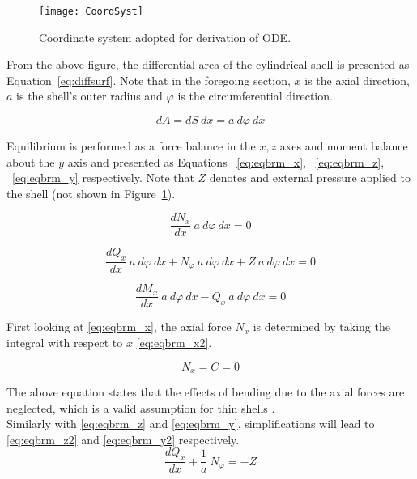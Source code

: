 \begin{figure}[H]
	\centering
	\texttt{[image: CoordSyst]}
	\caption[Coordinate system adopted for derivation of ODE.]{Coordinate system adopted for derivation of ODE.\protect\cite{timoshenko1959theory}}
	\label{fig:CoordSyst}
\end{figure}

From the above figure, the differential area of the cylindrical shell is presented as Equation~\ref{eq:diffsurf}. Note that in the foregoing section, $x$ is the axial direction, $a$ is the shell's outer radius and $\varphi$ is the circumferential direction.
 
\begin{equation}
	\label{eq:diffsurf}
	dA = dS\ dx = a\ d\varphi \ dx   
\end{equation}

Equilibrium is performed as a force balance in the $x, z$ axes and moment balance about the $y$ axis and presented as Equations ~\ref{eq:eqbrm_x}, ~\ref{eq:eqbrm_z}, ~\ref{eq:eqbrm_y} respectively. Note that $Z$ denotes and external pressure applied to the shell (not shown in Figure~\ref{fig:CoordSyst}).

\begin{equation}
	\label{eq:eqbrm_x}
	\frac{dN_x}{dx}\ a\ d\varphi \ dx = 0
\end{equation}

\begin{equation}
	\label{eq:eqbrm_z}
	\frac{dQ_x}{dx}\ a\ d\varphi \ dx+ N_\varphi \ a\ d\varphi \ dx +Z\ a\ d\varphi \ dx= 0
\end{equation}

\begin{equation}
	\label{eq:eqbrm_y}
	\frac{dM_x}{dx}\ a\ d\varphi \ dx- Q_x\ a\ d\varphi \ dx= 0
\end{equation}

First looking at \ref{eq:eqbrm_x}, the axial force $N_x$ is determined by taking the integral with respect to $x$ \ref{eq:eqbrm_x2}. 

\begin{equation}
	\label{eq:eqbrm_x2}
	N_x = C = 0 
\end{equation}

The above equation states that the effects of bending due to the axial forces are neglected, which is a valid assumption for thin shells \cite{timoshenko1959theory}.\\

Similarly with \ref{eq:eqbrm_z} and \ref{eq:eqbrm_y}, simplifications will lead to \ref{eq:eqbrm_z2} and \ref{eq:eqbrm_y2} respectively.
\begin{equation}
	\label{eq:eqbrm_z2}
	\frac{dQ_x}{dx}+\frac{1}{a}\ N_\varphi = -Z
\end{equation}


